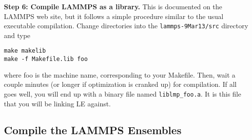 \documentclass[10pt]{article}
\begin{document}
\textbf{Step 6: Compile LAMMPS as a library.}
This is documented on the LAMMPS web site, but it follows
a simple procedure similar to the usual executable compilation. Change directories into
the \texttt{lammps-9Mar13/src} directory and type
\begin{verbatim}
make makelib
make -f Makefile.lib foo
\end{verbatim}
where foo is the machine name, corresponding to your Makefile. Then, wait a couple minutes
(or longer if optimization is cranked up) for compilation. If all goes well, you will
end up with a binary file named \texttt{liblmp\_foo.a}. It is this file that you will be
linking LE against.

\subsection{Compile the LAMMPS Ensembles}
\end{document}
